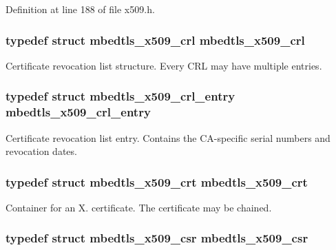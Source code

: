 Definition at line 188 of file x509.\-h.

\hypertarget{group__x509__module_ga7957605a0ced963e12880ec9e19874fc}{
\subsubsection[{mbedtls\-\_\-x509\-\_\-crl}]{\setlength{\rightskip}{0pt plus 5cm}typedef struct {\bf mbedtls\-\_\-x509\-\_\-crl}
 {\bf mbedtls\-\_\-x509\-\_\-crl}}}\label{group__x509__module_ga7957605a0ced963e12880ec9e19874fc}
Certificate revocation list structure. Every C\-R\-L may have multiple entries. \hypertarget{group__x509__module_ga1e0c6230061fd501f9d00bd1b09ade33}{
\subsubsection[{mbedtls\-\_\-x509\-\_\-crl\-\_\-entry}]{\setlength{\rightskip}{0pt plus 5cm}typedef struct {\bf mbedtls\-\_\-x509\-\_\-crl\-\_\-entry}
 {\bf mbedtls\-\_\-x509\-\_\-crl\-\_\-entry}}}\label{group__x509__module_ga1e0c6230061fd501f9d00bd1b09ade33}
Certificate revocation list entry. Contains the C\-A-\/specific serial numbers and revocation dates. \hypertarget{group__x509__module_ga836544fec94d5bc02bc97aa87885b9d9}{
\subsubsection[{mbedtls\-\_\-x509\-\_\-crt}]{\setlength{\rightskip}{0pt plus 5cm}typedef struct {\bf mbedtls\-\_\-x509\-\_\-crt}
 {\bf mbedtls\-\_\-x509\-\_\-crt}}}\label{group__x509__module_ga836544fec94d5bc02bc97aa87885b9d9}
Container for an X. certificate. The certificate may be chained. \hypertarget{group__x509__module_gae481b23df67001bdac96ef9c2ab3ef7c}{
\subsubsection[{mbedtls\-\_\-x509\-\_\-csr}]{\setlength{\rightskip}{0pt plus 5cm}typedef struct {\bf mbedtls\-\_\-x509\-\_\-csr}
 {\bf mbedtls\-\_\-x509\-\_\-csr}}}\label{group__x509__module_gae481b23df67001bdac96ef9c2ab3ef7c}
